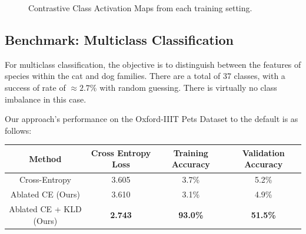 \documentclass{article}
\theoremstyle{plain}
\theoremstyle{definition}
\theoremstyle{remark}
\begin{document}
\begin{figure}[H]
	\centering
	\hspace{1em}
	\hspace{1em}
	\caption{Contrastive Class Activation Maps from each training setting.}
\end{figure}


\subsection{Benchmark: Multiclass Classification}

For multiclass classification, the objective is to distinguish between the features of species within the cat and dog families. There are a total of 37 classes, with a success of rate of $\approx 2.7\%$ with random guessing. There is virtually no class imbalance in this case.

Our approach's performance on the Oxford-IIIT Pets Dataset to the default is as follows:

\begin{table}[h]
	\centering
	\begin{tabular}{c|ccc}
		\toprule
		\textbf{Method}  & \textbf{Cross Entropy Loss}  & \textbf{Training Accuracy}   & \textbf{Validation Accuracy} \\
		\midrule
		Cross-Entropy & 3.605 & 3.7\% & 5.2\% \\
		Ablated CE (Ours) & 3.610 & 3.1\% & 4.9\% \\
		Ablated CE + KLD (Ours) & \bf 2.743 & \bf 93.0\% & \bf 51.5\% \\
		\bottomrule
	\end{tabular}
\end{table}
\end{document}
